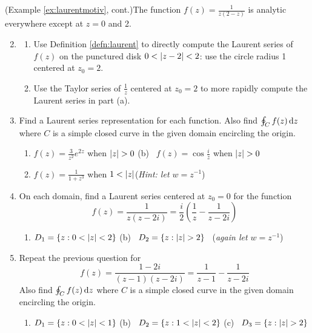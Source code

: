 \begin{exercises}
	\exstart (Example \ref{ex:laurentmotiv}, cont.)\lstsp The function $f(z)=\frac 1{z(2-z)}$ is analytic everywhere except at $z=0$ and 2.\vspace{-5pt}

	\begin{enumerate}\setcounter{enumi}{1}
	  \item[]\begin{enumerate}
	    \item Use Definition \ref{defn:laurent} to directly compute the Laurent series of $f(z)$ on the punctured disk $0<\left| z-2\right|<2$: use the circle radius 1 centered at $z_0=2$.
	    \item Use the Taylor series of $\frac 1z$ centered at $z_0=2$ to more rapidly compute the Laurent series in part (a).
	  \end{enumerate}
	  
	  
	  \item Find a Laurent series representation for each function. Also find $\oint_Cf(z)\,{\mathrm{d} z}$ where $C$ is a simple closed curve in the given domain encircling the origin.
	  \begin{enumerate}
	    \item $f(z)=\frac 3{z^2}e^{2z}$ when $\nm z>0$
	    \qquad\qquad\qquad\qquad\qquad
	    (b) \ $f(z)=\cos\frac iz$ when $\nm z>0$
	    \setcounter{enumii}{2}
	    \item $f(z)=\frac 1{1+z^3}$ when $1<\left| z\right|$\quad (\emph{Hint: let $w=z^{-1}$})
	  \end{enumerate}
	  
	  \goodbreak
	  
	  \item On each domain, find a Laurent series centered at $z_0=0$ for the function
	  \[
	  	f(z)=\frac{1}{z(z-2i)}=\frac i2\left(\frac 1z-\frac 1{z-2i}\right)
	  \]
	  \begin{enumerate}
	    \item $D_1=\{z:0<\left| z\right|<2\}$
	    \qquad\qquad
	    (b) \ $D_2=\{z:\nm z>2\}$ \ (\emph{again let $w=z^{-1}$})
		\end{enumerate}
		
		
		\item Repeat the previous question for
	  \[
	  	f(z)=\frac{1-2i}{(z-1)(z-2i)}=\frac 1{z-1}-\frac 1{z-2i}
	  \]
	  Also find $\oint_Cf(z)\,{\mathrm{d} z}$ where $C$ is a simple closed curve in the given domain encircling the origin.
	  \begin{enumerate}
	    \item $D_1=\{z:0<\left| z\right|<1\}$
	    \qquad\quad%
	    (b) \ $D_2=\{z:1<\left| z\right|<2\}$
			\qquad\quad
			(c) \ $D_3=\{z:\nm z>2\}$
		\end{enumerate}
	

\end{enumerate}
\end{exercises}
